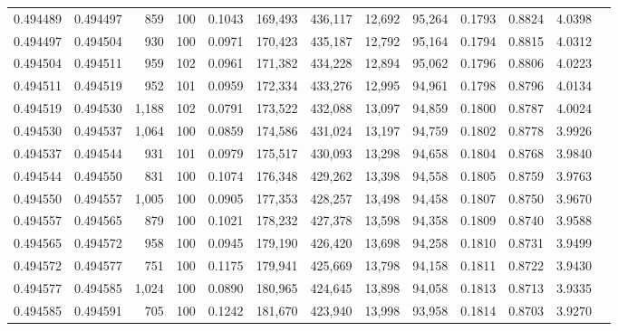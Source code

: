 \begin{tabular}{rrrrrrrrrrrrr}
0.494489 & 0.494497 &   859 & 100 &                                     0.1043 & 169,493 & 436,117 &  12,692 &  95,264 & 0.1793 & 0.8824 & 4.0398 \\
0.494497 & 0.494504 &   930 & 100 &                                     0.0971 & 170,423 & 435,187 &  12,792 &  95,164 & 0.1794 & 0.8815 & 4.0312 \\
0.494504 & 0.494511 &   959 & 102 &                                     0.0961 & 171,382 & 434,228 &  12,894 &  95,062 & 0.1796 & 0.8806 & 4.0223 \\
0.494511 & 0.494519 &   952 & 101 &                                     0.0959 & 172,334 & 433,276 &  12,995 &  94,961 & 0.1798 & 0.8796 & 4.0134 \\
0.494519 & 0.494530 & 1,188 & 102 &                                     0.0791 & 173,522 & 432,088 &  13,097 &  94,859 & 0.1800 & 0.8787 & 4.0024 \\
0.494530 & 0.494537 & 1,064 & 100 &                                     0.0859 & 174,586 & 431,024 &  13,197 &  94,759 & 0.1802 & 0.8778 & 3.9926 \\
0.494537 & 0.494544 &   931 & 101 &                                     0.0979 & 175,517 & 430,093 &  13,298 &  94,658 & 0.1804 & 0.8768 & 3.9840 \\
0.494544 & 0.494550 &   831 & 100 &                                     0.1074 & 176,348 & 429,262 &  13,398 &  94,558 & 0.1805 & 0.8759 & 3.9763 \\
0.494550 & 0.494557 & 1,005 & 100 &                                     0.0905 & 177,353 & 428,257 &  13,498 &  94,458 & 0.1807 & 0.8750 & 3.9670 \\
0.494557 & 0.494565 &   879 & 100 &                                     0.1021 & 178,232 & 427,378 &  13,598 &  94,358 & 0.1809 & 0.8740 & 3.9588 \\
0.494565 & 0.494572 &   958 & 100 &                                     0.0945 & 179,190 & 426,420 &  13,698 &  94,258 & 0.1810 & 0.8731 & 3.9499 \\
0.494572 & 0.494577 &   751 & 100 &                                     0.1175 & 179,941 & 425,669 &  13,798 &  94,158 & 0.1811 & 0.8722 & 3.9430 \\
0.494577 & 0.494585 & 1,024 & 100 &                                     0.0890 & 180,965 & 424,645 &  13,898 &  94,058 & 0.1813 & 0.8713 & 3.9335 \\
0.494585 & 0.494591 &   705 & 100 &                                     0.1242 & 181,670 & 423,940 &  13,998 &  93,958 & 0.1814 & 0.8703 & 3.9270 \\

\end{tabular}
